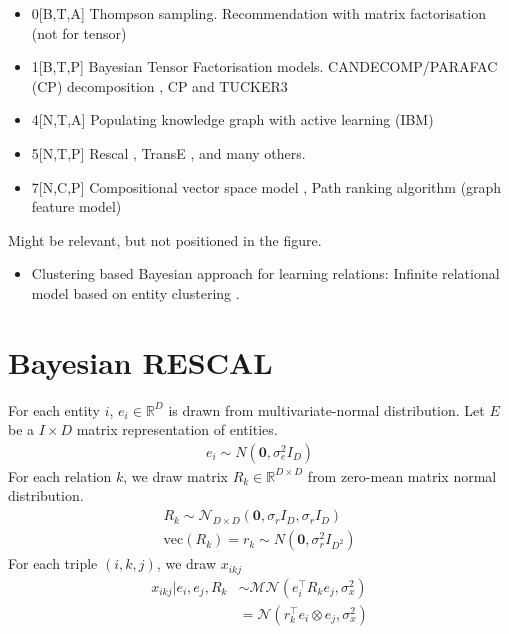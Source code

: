 \documentclass{article}
\begin{document}
\begin{itemize}
\item 0[B,T,A] Thompson sampling. Recommendation with matrix factorisation (not for tensor) \cite{kawale2015efficient}
\item 1[B,T,P] Bayesian Tensor Factorisation models. CANDECOMP/PARAFAC (CP) decomposition \cite{xiong2010temporal,schmidt2009probabilistic}, CP and TUCKER3 \cite{yilmaz2012algorithms}
\item 4[N,T,A] Populating knowledge graph with active learning (IBM) \cite{kajino2015active}
\item 5[N,T,P] Rescal \cite{nickel2011three}, TransE \cite{bordes2013translating}, and many others.
\item 7[N,C,P] Compositional vector space model \cite{Neelakantan2015}, Path ranking algorithm (graph feature model) \cite{Lao2010}
\end{itemize}

Might be relevant, but not positioned in the figure.
\begin{itemize}
\item Clustering based Bayesian approach for learning relations: Infinite relational model based on entity clustering \cite{kemp2006learning}.
\end{itemize}

\section{Bayesian RESCAL}

For each entity $i$, $e_i \in \mathbb{R}^{D}$ is drawn from multivariate-normal distribution. Let $E$ be a $I \times D$ matrix representation of entities.
\begin{align}
e_i \sim {N}(\mathbf{0}, \sigma_e^2{I}_D)
\end{align}
For each relation $k$, we draw matrix $R_k \in \mathbb{R}^{D\times D}$ from zero-mean matrix normal distribution.
\begin{align}
R_k \sim \mathcal{N}_{D \times D}(\mathbf{0}, \sigma_r{I}_D, \sigma_r{I}_D) \\
\text{vec}(R_k) = r_k \sim N(\mathbf{0}, \sigma_r^2 I_{D^2})
\end{align}
For each triple $(i,k,j)$, we draw $x_{ikj}$
\begin{align}
x_{ikj} |e_i, e_j, R_k &\sim \mathcal{MN}(e_i^{\top} R_k e_j, \sigma_x^2)\\
& = \mathcal{N}(r_k^{\top} e_i \otimes e_j, \sigma_x^2)
\end{align}
\end{document}
